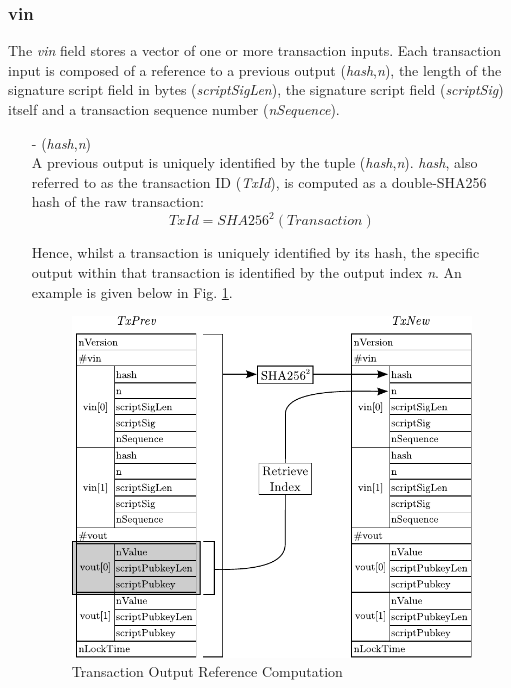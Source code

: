 \subsubsection*{vin}
The \textit{vin} field stores a vector of one or more transaction inputs. Each transaction input is composed of a reference to a previous output (\textit{hash},\textit{n}), the length of the signature script field in bytes (\textit{scriptSigLen}),
the signature script field (\textit{scriptSig}) itself and a transaction sequence number (\textit{nSequence}).

\begin{itemize}
\item[-] (\textit{hash},\textit{n})~\\
A previous output is uniquely identified by the tuple (\textit{hash},\textit{n}). \textit{hash}, also referred to as the transaction ID (\textit{TxId}), is computed as a double-SHA256 hash of the raw transaction:
\begin{equation}
TxId = SHA256^{2}(Transaction)
\end{equation}

Hence, whilst a transaction is uniquely identified by its hash, the specific output within that transaction is identified by the output index \textit{n}. An example is given below in Fig. \ref{fig:PrevOut}.
\begin{figure}[ht!]
 \centering
 \includegraphics[scale=0.9]{images/Transaction2In2Out.pdf}
 \caption{Transaction Output Reference Computation} \label{fig:PrevOut}
\end{figure}


\end{itemize}
